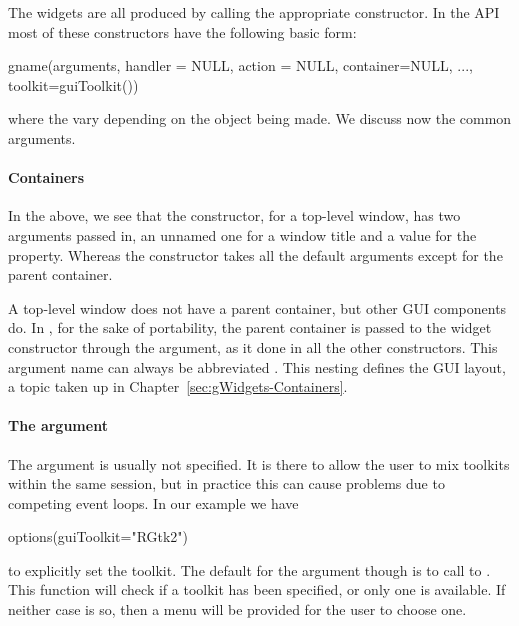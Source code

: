 The widgets are all produced by calling the appropriate constructor.
In the  API most of these constructors have the
following basic form:
\begin{Schunk}
\begin{Sinput}
 gname(arguments, handler = NULL, action = NULL, 
       container=NULL, ..., toolkit=guiToolkit())
\end{Sinput}
\end{Schunk}
where the  vary depending on the object being made. We
discuss now the common arguments.

\paragraph{Containers}
In the above, we see that the  constructor, for a
top-level window, has two arguments passed in, an unnamed one for a
window title and a value for the  property. Whereas the
 constructor takes all the default arguments except for
the parent container.

A top-level window does not have a parent container, but other GUI
components do. In , for the sake of portability, the
parent container is passed to the widget constructor through the
 argument, as it done in all the other constructors.
This argument name can always be abbreviated . This nesting
defines the GUI layout, a topic taken up in
Chapter~\ref{sec:gWidgets-Containers}.

\paragraph{The  argument}
The  argument is usually not specified. It is there to
allow the user to mix toolkits within the same \R\/ session, but in
practice this can cause problems due to competing event loops. 
In our example we have 
\begin{Schunk}
\begin{Sinput}
 options(guiToolkit="RGtk2")
\end{Sinput}
\end{Schunk}
%
to explicitly set the toolkit. The default for the 
argument though is to call to . This function
will check if a toolkit has been specified, or only one is
available. If neither case is so, then a menu will be provided for the
user to choose one.


